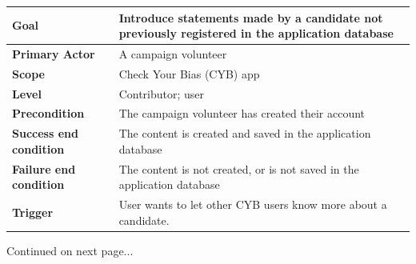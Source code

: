 \documentclass[11pt]{article}
\begin{document}
\begin{centering}
\begin{tabular}{|p{2.5cm}|p{13cm}|}
    \hline
    \textbf{Goal} & Introduce statements made by a candidate not previously registered in the application database\\
    \hline
    \textbf{Primary \newline Actor} & A campaign volunteer\\
    \hline
    \textbf{Scope} & Check Your Bias (CYB) app\\
    \hline
    \textbf{Level} & Contributor; user\\
    \hline
    \textbf{Precondition} & The campaign volunteer has created their account\\
    \hline
    \textbf{Success end \newline condition} & The content is created and saved in the application database\\
    \hline
    \textbf{Failure end \newline condition} & The content is not created, or is not saved in the application database\\
    \hline
    \textbf{Trigger} & User wants to let other CYB users know more about a candidate.\\
    \hline
\end{tabular}

\vspace{20pt}

Continued on next page...


\end{centering}
\end{document}
